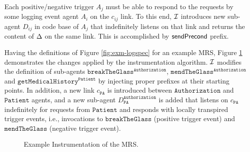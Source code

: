 Each positive/negative trigger $A_j$ must be able to respond to the requests by some logging event agent $A_i$ on the $c_{ij}$ link. To this end, $\mathcal{I}$ introduces new sub-agent $D_{ij}$ in code base of $A_j$ that indefinitely listens on that link and returns the content of $\Delta$ on the same link. This is accomplished by $\mathsf{sendPrecond}$ prefix.

Having the definitions of Figure \ref{fig:exm-logspec} for an example MRS, Figure \ref{fig:exm-inst} demonstrates the changes applied by the instrumentation algorithm.  $\mathcal{I}$ modifies the definition of sub-agents  $\mathtt{breakTheGlass}^{\mathtt{Authorization}}$, $\mathtt{mendTheGlass}^{\mathtt{Authorization}}$ and $\mathtt{getMedicalHistory}^{\mathtt{Patient}}$ by injecting proper prefixes at their starting points. In addition, a new link $c_{\mathtt{PA}}$ is introduced between $\mathtt{Authorization}$ and $\mathtt{Patient}$ agents, and a new sub-agent  $D_{\mathtt{PA}}^{\mathtt{Authorization}}$ is added that listens on $c_{\mathtt{PA}}$ indefinitely for requests from  $\mathtt{Patient}$ and responds with locally transpired trigger events, i.e., invocations to $\mathtt{breakTheGlass}$ (positive trigger event) and $\mathtt{mendTheGlass}$ (negative trigger event).


\begin{figure}
\setlength{\fboxsep}{0pt}%
\caption{Example Instrumentation of the MRS.}
\label{fig:exm-inst}
\end{figure}

